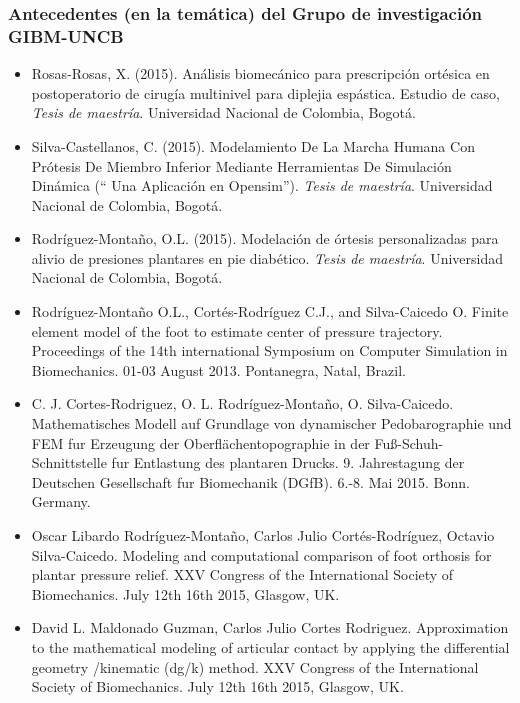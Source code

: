 \documentclass[12pt,english]{article}
\begin{document}
\subsubsection*{Antecedentes (en la temática) del Grupo de investigación GIBM-UNCB}
\begin{itemize}
\item Rosas-Rosas, X. (2015). Análisis biomecánico para prescripción ortésica
en postoperatorio de cirugía multinivel para diplejia espástica. Estudio
de caso, \emph{Tesis de maestría}. Universidad Nacional de Colombia,
Bogotá.
\item Silva-Castellanos, C. (2015). Modelamiento De La Marcha Humana Con
Prótesis De Miembro Inferior Mediante Herramientas De Simulación Dinámica
(“ Una Aplicación en Opensim”). \emph{Tesis de maestría}. Universidad
Nacional de Colombia, Bogotá.
\item Rodríguez-Montaño, O.L. (2015). Modelación de órtesis personalizadas
para alivio de presiones plantares en pie diabético. \emph{Tesis de
maestría}. Universidad Nacional de Colombia, Bogotá.
\item Rodríguez-Montaño O.L., Cortés-Rodríguez C.J., and Silva-Caicedo O. Finite element model of the foot to estimate center of pressure trajectory. Proceedings of the 14th international Symposium on Computer Simulation in Biomechanics. 01-03 August 2013. Pontanegra, Natal, Brazil.
\item C. J. Cortes-Rodriguez, O. L. Rodríguez-Montaño, O. Silva-Caicedo. Mathematisches Modell auf Grundlage von dynamischer Pedobarographie und FEM fur Erzeugung der Oberflächentopographie in der Fuß-Schuh-Schnittstelle fur Entlastung des plantaren Drucks. 9. Jahrestagung der Deutschen Gesellschaft fur Biomechanik (DGfB). 6.-8. Mai 2015. Bonn. Germany.
\item Oscar Libardo Rodríguez-Montaño, Carlos Julio Cortés-Rodríguez, Octavio Silva-Caicedo. Modeling and computational comparison of foot orthosis for plantar pressure relief. XXV Congress of the International Society of Biomechanics. July 12th  16th 2015, Glasgow, UK.
\item David L. Maldonado Guzman, Carlos Julio Cortes Rodriguez. Approximation to the mathematical modeling of articular contact by applying the differential geometry /kinematic (dg/k) method. XXV Congress of the International Society of Biomechanics. July 12th  16th 2015, Glasgow, UK.
\end{itemize}
\end{document}
